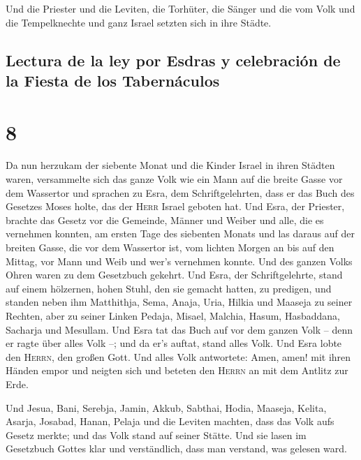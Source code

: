  Und die Priester und die Leviten, die Torhüter, die
Sänger und die vom Volk und die Tempelknechte und ganz Israel setzten
sich in ihre Städte.

\hypertarget{lectura-de-la-ley-por-esdras-y-celebraciuxf3n-de-la-fiesta-de-los-tabernuxe1culos}{%
\subsection{Lectura de la ley por Esdras y celebración de la Fiesta de
los
Tabernáculos}\label{lectura-de-la-ley-por-esdras-y-celebraciuxf3n-de-la-fiesta-de-los-tabernuxe1culos}}

\hypertarget{section-7}{%
\section{8}\label{section-7}}

 Da nun herzukam der siebente Monat und die Kinder Israel
in ihren Städten waren, versammelte sich das ganze Volk wie ein Mann auf
die breite Gasse vor dem Wassertor und sprachen zu Esra, dem
Schriftgelehrten, dass er das Buch des Gesetzes Moses holte, das der
\textsc{Herr} Israel geboten hat.  Und Esra, der Priester,
brachte das Gesetz vor die Gemeinde, Männer und Weiber und alle, die es
vernehmen konnten, am ersten Tage des siebenten Monats 
und las daraus auf der breiten Gasse, die vor dem Wassertor ist, vom
lichten Morgen an bis auf den Mittag, vor Mann und Weib und wer's
vernehmen konnte. Und des ganzen Volks Ohren waren zu dem Gesetzbuch
gekehrt.  Und Esra, der Schriftgelehrte, stand auf einem
hölzernen, hohen Stuhl, den sie gemacht hatten, zu predigen, und standen
neben ihm Matthithja, Sema, Anaja, Uria, Hilkia und Maaseja zu seiner
Rechten, aber zu seiner Linken Pedaja, Misael, Malchia, Hasum,
Hasbaddana, Sacharja und Mesullam.  Und Esra tat das Buch
auf vor dem ganzen Volk -- denn er ragte über alles Volk --; und da er's
auftat, stand alles Volk.  Und Esra lobte den
\textsc{Herrn}, den großen Gott. Und alles Volk antwortete: Amen, amen!
mit ihren Händen empor und neigten sich und beteten den \textsc{Herrn}
an mit dem Antlitz zur Erde.

 Und Jesua, Bani, Serebja, Jamin, Akkub, Sabthai, Hodia,
Maaseja, Kelita, Asarja, Josabad, Hanan, Pelaja und die Leviten machten,
dass das Volk aufs Gesetz merkte; und das Volk stand auf seiner Stätte.
 Und sie lasen im Gesetzbuch Gottes klar und verständlich,
dass man verstand, was gelesen ward.

